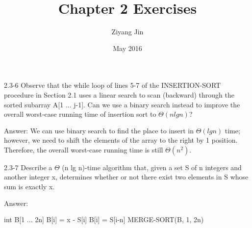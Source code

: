 \documentclass{article}
\title{Chapter 2 Exercises}
\author{Ziyang Jin}
\date{May 2016}
\begin{document}
2.3-6
Observe that the while loop of lines 5-7 of the INSERTION-SORT procedure in Section 2.1 uses a linear search to scan (backward) through the sorted subarray A[1 ... j-1]. Can we use a binary search instead to improve the overall worst-case running time of insertion sort to $\Theta (n lg n)$?

Answer:
We can use binary search to find the place to insert in $\Theta (lg n)$ time; however, we need to shift the elements of the array to the right by 1 position. Therefore, the overall worst-case running time is still $\Theta (n^2)$.

2.3-7
Describe a $\Theta$ (n lg n)-time algorithm that, given a set S of n integers and another integer x, determines whether or not there exist two elements in S whose sum is exactly x.

Answer:
\begin{algorithm}
\begin{algorithmic}[1]
 
    \State int B[1 ... 2n]
        \State B[i] = x - S[i]
    \EndFor
        \State B[i] = S[i-n]
    \EndFor
    \State MERGE-SORT(B, 1, 2n)
        \EndIf
    \EndFor
\EndProcedure
\end{algorithmic}
\end{algorithm}  
\end{document}
